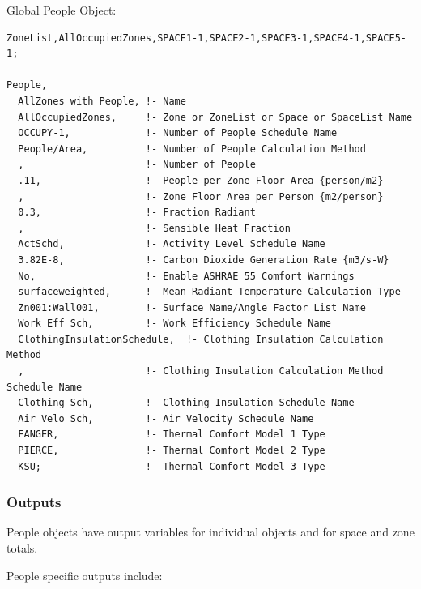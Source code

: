 Global People Object:

\begin{lstlisting}
ZoneList,AllOccupiedZones,SPACE1-1,SPACE2-1,SPACE3-1,SPACE4-1,SPACE5-1;

People,
  AllZones with People, !- Name
  AllOccupiedZones,     !- Zone or ZoneList or Space or SpaceList Name
  OCCUPY-1,             !- Number of People Schedule Name
  People/Area,          !- Number of People Calculation Method
  ,                     !- Number of People
  .11,                  !- People per Zone Floor Area {person/m2}
  ,                     !- Zone Floor Area per Person {m2/person}
  0.3,                  !- Fraction Radiant
  ,                     !- Sensible Heat Fraction
  ActSchd,              !- Activity Level Schedule Name
  3.82E-8,              !- Carbon Dioxide Generation Rate {m3/s-W}
  No,                   !- Enable ASHRAE 55 Comfort Warnings
  surfaceweighted,      !- Mean Radiant Temperature Calculation Type
  Zn001:Wall001,        !- Surface Name/Angle Factor List Name
  Work Eff Sch,         !- Work Efficiency Schedule Name
  ClothingInsulationSchedule,  !- Clothing Insulation Calculation Method
  ,                     !- Clothing Insulation Calculation Method Schedule Name
  Clothing Sch,         !- Clothing Insulation Schedule Name
  Air Velo Sch,         !- Air Velocity Schedule Name
  FANGER,               !- Thermal Comfort Model 1 Type
  PIERCE,               !- Thermal Comfort Model 2 Type
  KSU;                  !- Thermal Comfort Model 3 Type
\end{lstlisting}

\subsubsection{Outputs}\label{outputs-017}

People objects have output variables for individual objects and for space and zone totals.

People specific outputs include:

